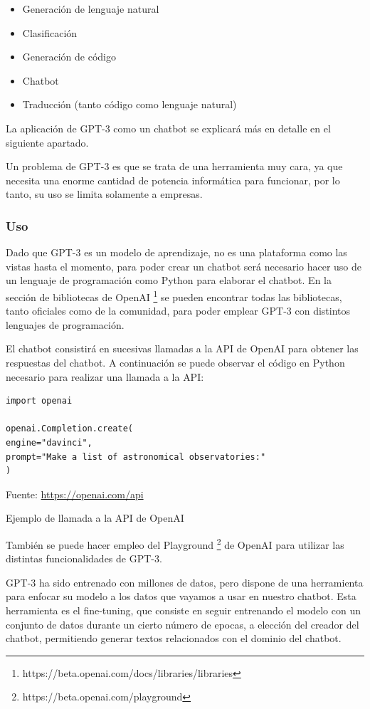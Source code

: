 \begin{itemize}
\item Generación de lenguaje natural
\item Clasificación
\item Generación de código
\item Chatbot
\item Traducción (tanto código como lenguaje natural)
\end{itemize}

La aplicación de GPT-3 como un chatbot se explicará más en detalle en el siguiente apartado.

Un problema de GPT-3 es que se trata de una herramienta muy cara, ya que necesita una enorme cantidad de potencia informática para funcionar, por lo tanto, su uso se limita solamente a empresas.

\subsubsection*{Uso}

Dado que GPT-3 es un modelo de aprendizaje, no es una plataforma como las vistas hasta el momento, para poder crear un chatbot será necesario hacer uso de un lenguaje de programación como Python para elaborar el chatbot. En la sección de bibliotecas de OpenAI \footnote{https://beta.openai.com/docs/libraries/libraries} se pueden encontrar todas las bibliotecas, tanto oficiales como de la comunidad, para poder emplear GPT-3 con distintos lenguajes de programación.

El chatbot consistirá en sucesivas llamadas a la \gls{API} de OpenAI para obtener las respuestas del chatbot. A continuación se puede observar el código en Python necesario para realizar una llamada a la \gls{API}:

\begin{lstlisting}
import openai

openai.Completion.create(
engine="davinci",
prompt="Make a list of astronomical observatories:"
)
\end{lstlisting}
\begin{center}
Fuente: \url{https://openai.com/api}
\end{center}
\caption{Ejemplo de llamada a la API de OpenAI}

También se puede hacer empleo del Playground \footnote{https://beta.openai.com/playground} de OpenAI para utilizar las distintas funcionalidades de GPT-3.

GPT-3 ha sido entrenado con millones de datos, pero dispone de una herramienta para enfocar su modelo a los datos que vayamos a usar en nuestro chatbot. Esta herramienta es el fine-tuning, que consiste en seguir entrenando el modelo con un conjunto de datos durante un cierto número de \gls{epocas}, a elección del creador del chatbot, permitiendo generar textos relacionados con el dominio del chatbot.

